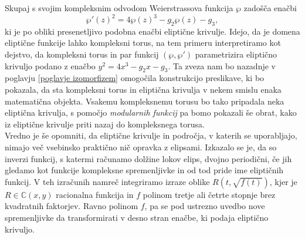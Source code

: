 \documentclass[mat1]{fmfdelo}
\numberwithin{equation}{section}
\newcommand{\C}{\mathbb C}
\theoremstyle{definition}
\begin{document}
Skupaj s svojim kompleksnim odvodom Weierstrassova funkcija $\wp$ zadošča enačbi
\[
  \wp'(z)^2 = 4\wp(z)^3 - g_2\wp(z) - g_3,  
\] 
ki je po obliki presenetljivo podobna enačbi eliptične krivulje. Idejo, da je domena eliptične funkcije lahko kompleksni torus, na tem primeru interpretiramo kot dejstvo, da kompleksni torus in par funkcij $(\wp, \wp')$ parametrizira eliptično krivuljo podano z enačbo $y^2 = 4x^3 - g_2x - g_3$.
Ta zveza nam bo nazadnje v poglavju \ref{poglavje izomorfizem} omogočila konstrukcijo preslikave, ki bo pokazala, da sta kompleksni torus in eliptična krivulja v nekem smislu enaka matematična objekta. Vsakemu kompleksnemu torusu bo tako pripadala neka eliptična krivulja, s pomočjo \emph{modularnih funkcij} pa bomo pokazali še obrat, kako iz eliptične krivulje priti nazaj do kompleksnega torusa. 
\\

Vredno je še opomniti, da eliptične krivulje in področja, v katerih se uporabljajo,
nimajo več vsebinsko praktično nič opravka z elipsami. 
Izkazalo se je, da so inverzi funkcij, s katermi računamo dolžine lokov elips, dvojno periodični,
če jih gledamo kot funkcije kompleksne spremenljivke in od tod pride ime eliptičnih funkcij. V teh izračunih namreč integriramo izraze oblike $R(t, \sqrt{f(t)})$, kjer je $R \in \C(x,y)$ racionalna funkcija in $f$ polinom tretje ali četrte stopnje brez kvadratnih faktorjev. Ravno polinom $f$, pa se pod ustrezno uvedbo nove spremenljivke da transformirati v desno stran enačbe, ki podaja eliptično krivuljo. 

\end{document}
